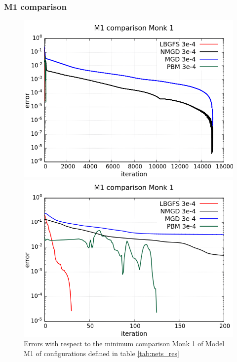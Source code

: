 \subsubsection{M1 comparison}

\begin{figure}[H]
	\centering
	\begin{minipage}[t]{0.5\linewidth}
		\includegraphics[width=\linewidth]{data/Comparison/Monk1/Monk1_M1_error_standard.png}
	\end{minipage}%
	\begin{minipage}[t]{0.5\linewidth}
		\includegraphics[width=\linewidth]{data/Comparison/Monk1/Monk1_M1_error_zoom.png}
	\end{minipage}
	\caption{Errors with respect to the minimum comparison Monk 1 of Model M1 of configurations defined in table \ref{tab:nets_res}}
	\label{R-Monk1-M1}
\end{figure}

